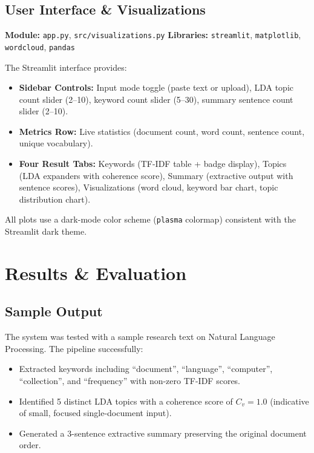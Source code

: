 \documentclass[12pt, a4paper]{article}
\begin{document}
\subsection{User Interface \& Visualizations}
\textbf{Module:} \texttt{app.py}, \texttt{src/visualizations.py} \quad \textbf{Libraries:} \texttt{streamlit}, \texttt{matplotlib}, \texttt{wordcloud}, \texttt{pandas}

The Streamlit interface provides:
\begin{itemize}
  \item \textbf{Sidebar Controls:} Input mode toggle (paste text or upload), LDA topic count slider (2--10), keyword count slider (5--30), summary sentence count slider (2--10).
  \item \textbf{Metrics Row:} Live statistics (document count, word count, sentence count, unique vocabulary).
  \item \textbf{Four Result Tabs:} Keywords (TF-IDF table + badge display), Topics (LDA expanders with coherence score), Summary (extractive output with sentence scores), Visualizations (word cloud, keyword bar chart, topic distribution chart).
\end{itemize}

All plots use a dark-mode color scheme (\texttt{plasma} colormap) consistent with the Streamlit dark theme.

\section{Results \& Evaluation}

\subsection{Sample Output}
The system was tested with a sample research text on Natural Language Processing. The pipeline successfully:
\begin{itemize}
  \item Extracted keywords including ``document'', ``language'', ``computer'', ``collection'', and ``frequency'' with non-zero TF-IDF scores.
  \item Identified 5 distinct LDA topics with a coherence score of $C_v = 1.0$ (indicative of small, focused single-document input).
  \item Generated a 3-sentence extractive summary preserving the original document order.
\end{itemize}
\end{document}
